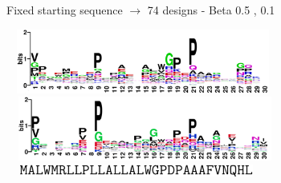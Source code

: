 \documentclass{beamer}
\begin{document}
\begin{frame}
\centering
Fixed starting sequence $\rightarrow$ 74 designs - Beta 0.5 , 0.1\\

\begin{adjustwidth}{-1.5em}{-2.5em}
\includegraphics[width=340px,height=80px]{../img/logo.png}\\ 
\includegraphics[width=345px,height=80px]{../img/logoBeta0-1.png}\\ 
\vspace{5px}
\hspace{18px}\includegraphics[width=324px,height=15px]{../img/sequence.png}
\end{adjustwidth}
\end{frame}
\end{document}

